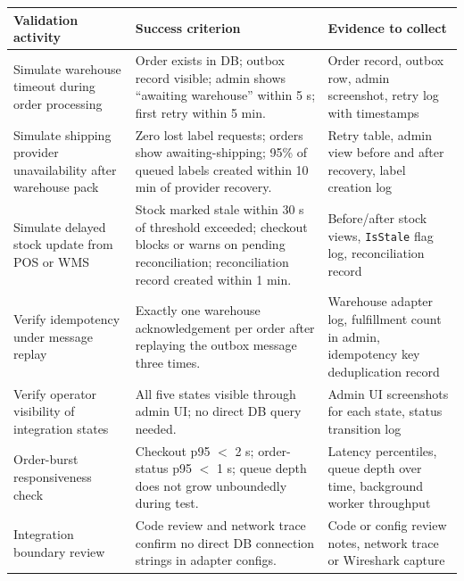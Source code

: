 \begingroup
\small
\setlength{\tabcolsep}{4pt}
\renewcommand{\arraystretch}{1.15}
\begin{center}
\begin{tabular}{|p{}|p{}|p{}|}
\hline
\textbf{Validation activity} & \textbf{Success criterion} & \textbf{Evidence to collect} \\
\hline
Simulate warehouse timeout during order processing &
Order exists in DB; outbox record visible; admin shows ``awaiting warehouse'' within 5 s; first retry within 5 min. &
Order record, outbox row, admin screenshot, retry log with timestamps \\
\hline
Simulate shipping provider unavailability after warehouse pack &
Zero lost label requests; orders show awaiting-shipping; 95\% of queued labels created within 10 min of provider recovery. &
Retry table, admin view before and after recovery, label creation log \\
\hline
Simulate delayed stock update from POS or WMS &
Stock marked stale within 30 s of threshold exceeded; checkout blocks or warns on pending reconciliation; reconciliation record created within 1 min. &
Before/after stock views, \texttt{IsStale} flag log, reconciliation record \\
\hline
Verify idempotency under message replay &
Exactly one warehouse acknowledgement per order after replaying the outbox message three times. &
Warehouse adapter log, fulfillment count in admin, idempotency key deduplication record \\
\hline
Verify operator visibility of integration states &
All five states visible through admin UI; no direct DB query needed. &
Admin UI screenshots for each state, status transition log \\
\hline
Order-burst responsiveness check &
Checkout p95 $<$ 2 s; order-status p95 $<$ 1 s; queue depth does not grow unboundedly during test. &
Latency percentiles, queue depth over time, background worker throughput \\
\hline
Integration boundary review &
Code review and network trace confirm no direct DB connection strings in adapter configs. &
Code or config review notes, network trace or Wireshark capture \\
\hline
\end{tabular}
\end{center}
\endgroup
